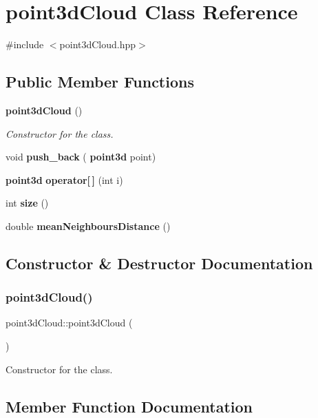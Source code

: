 \section{point3d\+Cloud Class Reference}
\label{classpoint3d_cloud}


{\ttfamily \#include $<$point3d\+Cloud.\+hpp$>$}

\subsection*{Public Member Functions}
\begin{DoxyCompactItemize}
\item 
\textbf{ point3d\+Cloud} ()
\begin{DoxyCompactList}\small\item\em Constructor for the class. \end{DoxyCompactList}\item 
void \textbf{ push\+\_\+back} (\textbf{ point3d} point)
\item 
\textbf{ point3d} \textbf{ operator[$\,$]} (int i)
\item 
int \textbf{ size} ()
\item 
double \textbf{ mean\+Neighbours\+Distance} ()
\end{DoxyCompactItemize}


\subsection{Constructor \& Destructor Documentation}
\mbox{\label{classpoint3d_cloud_a9997a8eba3508097aed26dd3dc8c12a0}} 
\subsubsection{point3d\+Cloud()}
{\footnotesize\ttfamily point3d\+Cloud\+::point3d\+Cloud (\begin{DoxyParamCaption}{ }\end{DoxyParamCaption})}



Constructor for the class. 



\subsection{Member Function Documentation}
\mbox{\label{classpoint3d_cloud_abaeea1c0f6c4cacec59890e0535a41a9}} 
